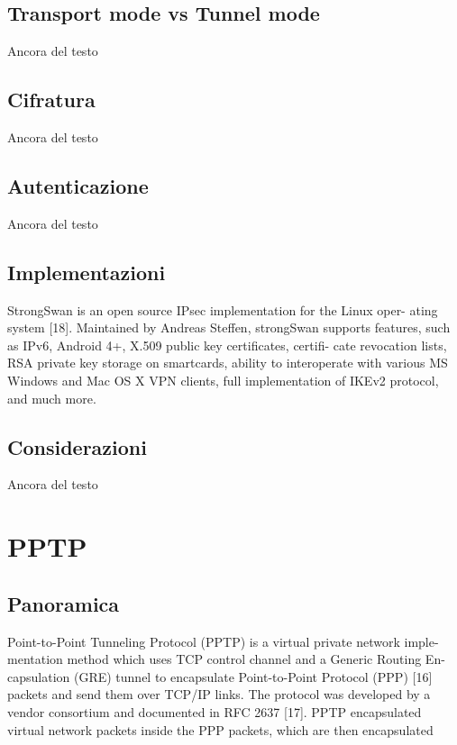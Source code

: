 \subsection{Transport mode vs Tunnel mode}
Ancora del testo

\subsection{Cifratura}
Ancora del testo

\subsection{Autenticazione}
Ancora del testo

\subsection{Implementazioni}
StrongSwan is an open source IPsec implementation for the Linux oper- ating system [18]. Maintained by Andreas Steffen, strongSwan supports features, such as IPv6, Android 4+, X.509 public key certificates, certifi- cate revocation lists, RSA private key storage on smartcards, ability to interoperate with various MS Windows and Mac OS X VPN clients, full implementation of IKEv2 protocol, and much more.

\subsection{Considerazioni}
Ancora del testo

\section{PPTP}
\subsection{Panoramica}
Point-to-Point Tunneling Protocol (PPTP) is a virtual private network imple- mentation method which uses TCP control channel and a Generic Routing En- capsulation (GRE) tunnel to encapsulate Point-to-Point Protocol (PPP) [16] packets and send them over TCP/IP links. The protocol was developed by a vendor consortium and documented in RFC 2637 [17]. PPTP encapsulated virtual network packets inside the PPP packets, which are then encapsulated

